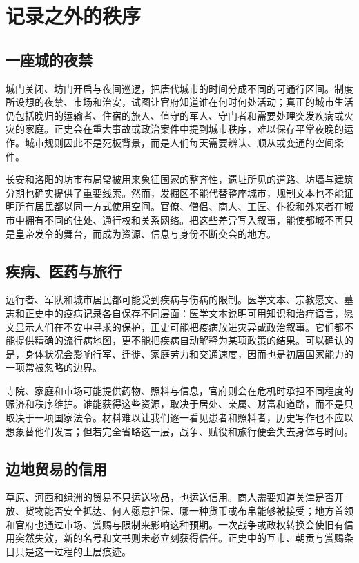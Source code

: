 \section{记录之外的秩序}
\label{sec:early-tang-acceptance-depth-pages-five}

\subsection{一座城的夜禁}
城门关闭、坊门开启与夜间巡逻，把唐代城市的时间分成不同的可通行区间。制度所设想的夜禁、市场和治安，试图让官府知道谁在何时何处活动；真正的城市生活仍包括晚归的运输者、住宿的旅人、值守的军人、守门者和需要处理突发疾病或火灾的家庭。正史会在重大事故或政治案件中提到城市秩序，难以保存平常夜晚的运作。城市规则因此不是死板背景，而是人们每天需要辨认、顺从或变通的空间条件。

长安和洛阳的坊市布局常被用来象征国家的整齐性，遗址所见的道路、坊墙与建筑分期也确实提供了重要线索。然而，发掘区不能代替整座城市，规制文本也不能证明所有居民都以同一方式使用空间。官僚、僧侣、商人、工匠、仆役和外来者在城市中拥有不同的住处、通行权和关系网络。把这些差异写入叙事，能使都城不再只是皇帝发令的舞台，而成为资源、信息与身份不断交会的地方。

\subsection{疾病、医药与旅行}
远行者、军队和城市居民都可能受到疾病与伤病的限制。医学文本、宗教愿文、墓志和正史中的疫病记录各自保存不同层面：医学文本说明可用知识和治疗语言，愿文显示人们在不安中寻求的保护，正史可能把疫病放进灾异或政治叙事。它们都不能提供精确的流行病地图，更不能把疾病自动解释为某项政策的结果。可以确认的是，身体状况会影响行军、迁徙、家庭劳力和交通速度，因而也是初唐国家能力的一项常被忽略的边界。

寺院、家庭和市场可能提供药物、照料与信息，官府则会在危机时承担不同程度的赈济和秩序维护。谁能获得这些资源，取决于居处、亲属、财富和道路，而不是只取决于一项国家法令。材料难以让我们逐一看见患者和照料者，历史写作也不应以想象替他们发言；但若完全省略这一层，战争、赋役和旅行便会失去身体与时间。

\subsection{边地贸易的信用}
草原、河西和绿洲的贸易不只运送物品，也运送信用。商人需要知道关津是否开放、货物能否安全抵达、何人愿意担保、哪一种货币或布帛能够被接受；地方首领和官府也通过市场、赏赐与限制来影响这种预期。一次战争或政权转换会使旧有信用突然失效，新的名号和文书则未必立刻获得信任。正史中的互市、朝贡与赏赐条目只是这一过程的上层痕迹。

